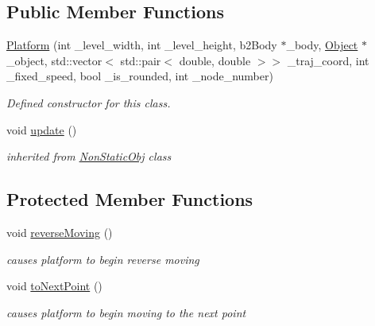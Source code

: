 \subsection*{Public Member Functions}
\begin{DoxyCompactItemize}
\item 
\hyperlink{class_platform_a7c8e5045e5df1165c1154605e1a05339}{Platform} (int \+\_\+level\+\_\+width, int \+\_\+level\+\_\+height, b2\+Body $\ast$\+\_\+body, \hyperlink{class_object}{Object} $\ast$\+\_\+object, std\+::vector$<$ std\+::pair$<$ double, double $>$$>$ \+\_\+traj\+\_\+coord, int \+\_\+fixed\+\_\+speed, bool \+\_\+is\+\_\+rounded, int \+\_\+node\+\_\+number)
\begin{DoxyCompactList}\small\item\em Defined constructor for this class. \end{DoxyCompactList}\item 
\mbox{\label{class_platform_aa601f00a3625669bb39252cfc932efa0}} 
void \hyperlink{class_platform_aa601f00a3625669bb39252cfc932efa0}{update} ()
\begin{DoxyCompactList}\small\item\em inherited from \hyperlink{class_non_static_obj}{Non\+Static\+Obj} class \end{DoxyCompactList}\end{DoxyCompactItemize}
\subsection*{Protected Member Functions}
\begin{DoxyCompactItemize}
\item 
\mbox{\label{class_platform_aae68e047eaa1046773ad62654c99421a}} 
void \hyperlink{class_platform_aae68e047eaa1046773ad62654c99421a}{reverse\+Moving} ()
\begin{DoxyCompactList}\small\item\em causes platform to begin reverse moving \end{DoxyCompactList}\item 
\mbox{\label{class_platform_a5462c5ec9fc865988ffccd2e0d67b2a9}} 
void \hyperlink{class_platform_a5462c5ec9fc865988ffccd2e0d67b2a9}{to\+Next\+Point} ()
\begin{DoxyCompactList}\small\item\em causes platform to begin moving to the next point \end{DoxyCompactList}\end{DoxyCompactItemize}
